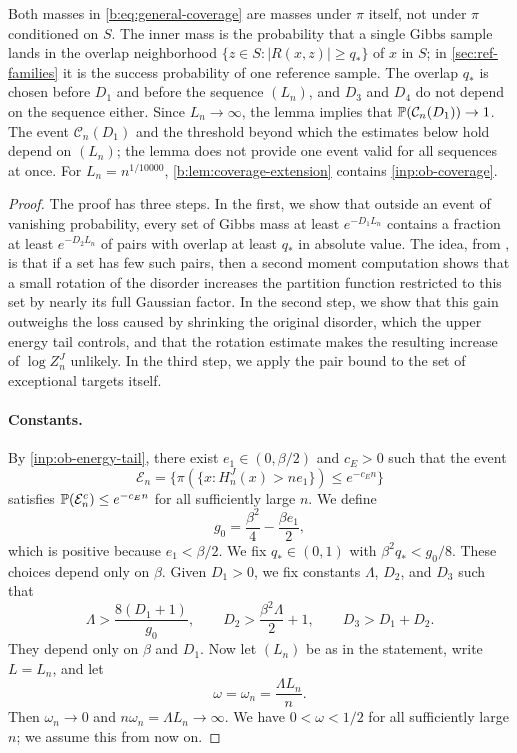 Both masses in \eqref{b:eq:general-coverage} are masses under $\pi$ itself,
not under $\pi$ conditioned on $S$. The inner mass is the probability that a
single Gibbs sample lands in the overlap neighborhood
$\{z\in S:|R(x,z)|\ge q_*\}$ of $x$ in $S$; in \cref{sec:ref-families} it is
the success probability of one reference sample. The overlap $q_*$ is chosen
before $D_1$ and before the sequence $(L_n)$, and $D_3$ and $D_4$ do not
depend on the sequence either. Since $L_n\to\infty$, the lemma implies that
$\mathbb P(\mathcal C_n(D_1))\to1$. The event $\mathcal C_n(D_1)$ and the threshold beyond
which the estimates below hold depend on $(L_n)$; the lemma does not provide
one event valid for all sequences at once. For $L_n=n^{1/10000}$,
\cref{b:lem:coverage-extension} contains \cref{inp:ob-coverage}.

\begin{proof}
The proof has three steps. In the first, we show that outside an event of
vanishing probability, every set of Gibbs mass at least $e^{-D_1L_n}$
contains a fraction at least $e^{-D_2L_n}$ of pairs with overlap at least
$q_*$ in absolute value. The idea, from \cite[Section~6]{oai-barriers}, is
that if a set has few such pairs, then a second moment computation shows
that a small rotation of the disorder increases the partition function
restricted to this set by nearly its full Gaussian factor. In the second
step, we show that this gain outweighs the loss caused by shrinking the
original disorder, which the upper energy tail controls, and that the
rotation estimate makes the resulting increase of $\log Z_n^J$ unlikely. In the
third step, we apply the pair bound to the set of exceptional targets
itself.

\paragraph{Constants.}
By \cref{inp:ob-energy-tail}, there exist $e_1\in(0,\beta/2)$ and $c_E>0$
such that the event
\[
 \mathcal E_n=\bigl\{\pi(\{x:H_n^J(x)>ne_1\})\le e^{-c_En}\bigr\}
\]
satisfies $\mathbb P(\mathcal E_n^c)\le e^{-c_En}$ for all sufficiently large $n$.
We define
\[
 g_0=\frac{\beta^2}4-\frac{\beta e_1}2,
\]
which is positive because $e_1<\beta/2$. We fix $q_*\in(0,1)$ with
$\beta^2q_*<g_0/8$. These choices depend only on $\beta$. Given $D_1>0$, we
fix constants $\Lambda$, $D_2$, and $D_3$ such that
\begin{equation}\label{eq:ref-cov-constants}
 \Lambda>\frac{8(D_1+1)}{g_0},\qquad
 D_2>\frac{\beta^2\Lambda}2+1,\qquad
 D_3>D_1+D_2 .
\end{equation}
They depend only on $\beta$ and $D_1$. Now let $(L_n)$ be as in the
statement, write $L=L_n$, and let
\[
 \omega=\omega_n=\frac{\Lambda L_n}n .
\]
Then $\omega_n\to0$ and $n\omega_n=\Lambda L_n\to\infty$. We have
$0<\omega<1/2$ for all sufficiently large $n$; we assume this from now
on.


\end{proof}

